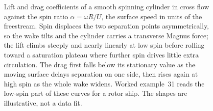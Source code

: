 \begin{figure}[htbp]
\centering
{}
\caption[Magnus lift and drag of a spinning cylinder]{Lift and drag
coefficients of a smooth spinning cylinder in cross flow against the spin ratio
$\alpha = \omega R/U$, the surface speed in units of the freestream. Spin
displaces the two separation points asymmetrically, so the wake tilts and the
cylinder carries a transverse Magnus force; the lift climbs steeply and nearly
linearly at low spin before rolling toward a saturation plateau where further
spin drives little extra circulation. The drag first falls below its stationary
value as the moving surface delays separation on one side, then rises again at
high spin as the whole wake widens. Worked example~31 reads the low-spin part of
these curves for a rotor ship. The shapes are illustrative, not a data fit.}
\label{fig:vol03ch12:magnus-lift-drag}
\end{figure}
